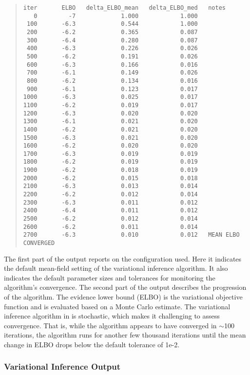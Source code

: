 \begin{quote}
\begin{Verbatim}[fontsize=\footnotesize]
iter       ELBO   delta_ELBO_mean   delta_ELBO_med   notes
   0         -7             1.000            1.000
 100       -6.3             0.544            1.000
 200       -6.2             0.365            0.087
 300       -6.4             0.280            0.087
 400       -6.3             0.226            0.026
 500       -6.2             0.191            0.026
 600       -6.3             0.166            0.016
 700       -6.1             0.149            0.026
 800       -6.2             0.134            0.016
 900       -6.1             0.123            0.017
1000       -6.3             0.025            0.017
1100       -6.2             0.019            0.017
1200       -6.3             0.020            0.020
1300       -6.1             0.021            0.020
1400       -6.2             0.021            0.020
1500       -6.3             0.021            0.020
1600       -6.2             0.020            0.020
1700       -6.3             0.019            0.019
1800       -6.2             0.019            0.019
1900       -6.2             0.018            0.019
2000       -6.2             0.015            0.018
2100       -6.3             0.013            0.014
2200       -6.2             0.012            0.014
2300       -6.3             0.011            0.012
2400       -6.4             0.011            0.012
2500       -6.2             0.012            0.014
2600       -6.2             0.011            0.014
2700       -6.3             0.010            0.012   MEAN ELBO CONVERGED
\end{Verbatim}
\end{quote}
%
The first part of the output reports on the configuration used. Here
it indicates the default mean-field setting of the variational
inference algorithm. It also indicates the default parameter sizes and
tolerances for monitoring the algorithm's convergence. The second part
of the output describes the progression of the algorithm. The evidence
lower bound (ELBO) is the variational objective function and is
evaluated based on a Monte Carlo estimate. The variational inference
algorithm in \Stan is stochastic, which makes it challenging to assess
convergence. That is, while the algorithm appears to have converged in
$\sim$100 iterations, the algorithm runs for another few thousand
iterations until the mean change in ELBO drops below the default
tolerance of 1e-2.


\subsubsection{Variational Inference Output}

